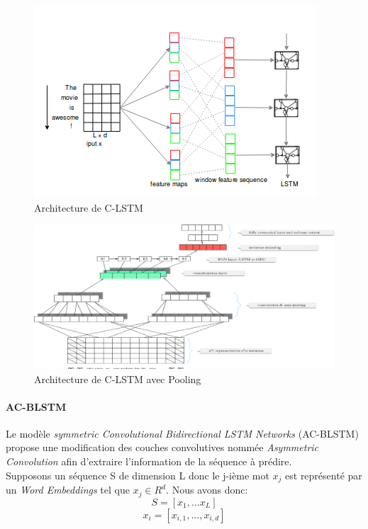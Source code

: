 \begin{figure}
\centering
\includegraphics[scale=0.45]{./tex/natural-language-processing/clstm.png}
\caption{Architecture de C-LSTM}
\label{clstm}
\end{figure}

\begin{figure}
\centering
\includegraphics[scale=0.3]{./tex/natural-language-processing/clstm2.png}
\caption{Architecture de C-LSTM avec Pooling}
\label{clst2m}
\end{figure}

\paragraph{AC-BLSTM}
Le modèle \textit{symmetric Convolutional Bidirectional LSTM Networks} (AC-BLSTM) \cite{acblstm} propose une modification des couches convolutives nommée \textit{Asymmetric Convolution} afin d'extraire l'information de la séquence à prédire.\\

\noindent Supposons un séquence S de dimension L donc le j-ième mot $x_j$ est représenté par un \textit{Word Embeddings} tel que $x_j \in R^d$. Nous avons donc:
$$S=[x_1,...x_L]$$
$$x_i=[x_{i,1},...,x_{i,d}]$$

